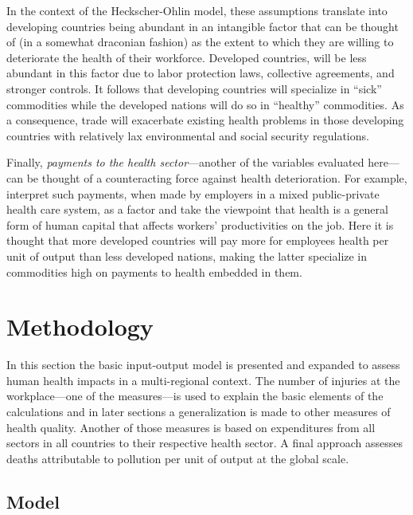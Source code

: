 \documentclass[a4paper,12pt, ]{article}
\begin{document}
In the context of the Heckscher-Ohlin model, these assumptions translate into developing countries being abundant in an intangible factor that can be thought of (in a somewhat draconian fashion) as the extent to which they are willing to deteriorate the health of their workforce. Developed countries, will be less abundant in this factor due to labor protection laws, collective agreements, and stronger controls. It follows that developing countries will specialize in ``sick'' commodities while the developed nations will do so in ``healthy'' commodities. As a consequence, trade will exacerbate existing health problems in those developing countries with relatively lax environmental and social security regulations. 

Finally, \textit{payments to the health sector}---another of the variables evaluated here---can be thought of a counteracting force against health deterioration. For example, \citet{fangGavazza2011} interpret such payments, when made by employers in a mixed public-private health care system, as a factor and take the viewpoint that health is a general form of human capital that affects workers' productivities on the job. Here it is thought that more developed countries will pay more for employees health per unit of output than less developed nations, making the latter specialize in commodities high on payments to health embedded in them.



\section{Methodology}
\label{sec:method}

In this section the basic input-output model is presented and expanded to assess human health impacts in a multi-regional context. The number of injuries at the workplace---one of the measures---is used to explain the basic elements of the calculations and in later sections a generalization is made to other measures of health quality. 
Another of those measures is based on expenditures from all sectors in all countries to their respective health sector.  A final approach assesses deaths attributable to pollution per unit of output at the global scale.

\subsection{Model}
\end{document}
